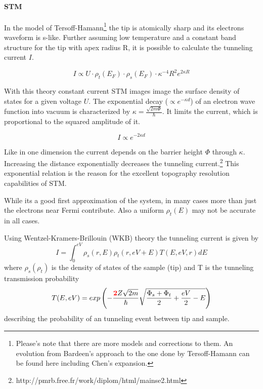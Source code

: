 \paragraph{STM}
In the model of Tersoff-Hamann\footnote{Please's note that there are more models and corrections to them. An evolution from Bardeen's approach to the one done by Tersoff-Hamann can be found here \cite{lounis_theory_2014, wortmann_interpretation_2000} including Chen's expansion.} the tip is atomically sharp and its electrons waveform is s-like. Further assuming low temperature and a constant band structure for the tip with apex radius R, it is possible to calculate the tunneling current $I$. 

$$I \propto U \cdot \rho_t(E_F) \cdot \rho_s(E_F) \cdot \kappa^{-4}R^2e^{2\kappa R} $$

With this theory constant current STM images image the surface density of states for  a given voltage $U$. The exponential decay ($\propto e^{-\kappa d}$) of an electron wave function into vacuum is characterized by $\kappa=\frac{\sqrt{2m\Phi}}{\hbar}$. It limits the current, which is proportional to the squared amplitude of it. 

$$I\propto e^{-2\kappa d}$$

Like in one dimension the current depends on the barrier height $\Phi$ through $\kappa$. Increasing the distance exponentially decreases the tunneling current.\footnote{http://pmrb.free.fr/work/diplom/html/mainse2.html} This exponential relation is the reason for the excellent topography resolution capabilities of STM.

While its a good first approximation of the system, in many cases more than just the electrons near Fermi contribute. Also a uniform $\rho_t(E)$ may not be accurate in all cases.

Using  Wentzel-Kramers-Brillouin (WKB) theory\cite{wentzel_verallgemeinerung_1926, kramers_wellenmechanik_1926, brillouin_mecanique_1926} the tunneling current is given by
\begin{equation}
I=\int_0^{eV}\rho_s(r,E)\rho_t(r,eV+E)T(E,eV,r)dE
\label{WKB}
\end{equation}
where $\rho_s(\rho_t)$ is the density of states of the sample (tip) and T is the tunneling transmission probability
\begin{equation}
T(E,eV)=exp\left(-\frac{\textcolor{red}{\textbf{2}}Z\sqrt{2m}}{\hbar}\sqrt{\frac{\Phi_s+\Phi_t}{2}+\frac{eV}{2}-E}\right)
\label{Transmission-function} 
\end{equation}
describing the probability of an tunneling event between tip and sample.

